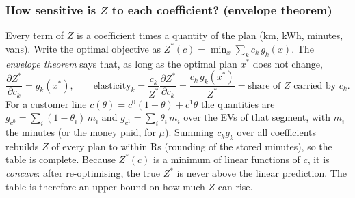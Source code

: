 \subsubsection{How sensitive is $Z$ to each coefficient? (envelope theorem)}
Every term of $Z$ is a coefficient times a quantity of the plan (km, kWh, minutes, vans). Write the optimal objective as $Z^{*}(c)=\min_{x}\sum_k c_k\,g_k(x)$. The \emph{envelope theorem} says that, as long as the optimal plan $x^{*}$ does not change,
\[
\frac{\partial Z^{*}}{\partial c_k}=g_k(x^{*}),\qquad
\text{elasticity}_k=\frac{c_k}{Z^{*}}\frac{\partial Z^{*}}{\partial c_k}=\frac{c_k\,g_k(x^{*})}{Z^{*}}=\text{share of }Z\text{ carried by }c_k .
\]
For a customer line $c(\theta)=c^{0}(1-\theta)+c^{1}\theta$ the quantities are $g_{c^{0}}=\sum_i(1-\theta_i)\,m_i$ and $g_{c^{1}}=\sum_i\theta_i\,m_i$ over the EVs of that segment, with $m_i$ the minutes (or the money paid, for $\mu$). Summing $c_k g_k$ over all coefficients rebuilds $Z$ of every plan to within \ZRecMax{} Rs (rounding of the stored minutes), so the table is complete. Because $Z^{*}(c)$ is a minimum of linear functions of $c$, it is \emph{concave}: after re-optimising, the true $Z^{*}$ is never above the linear prediction. The table is therefore an upper bound on how much $Z$ can rise.

